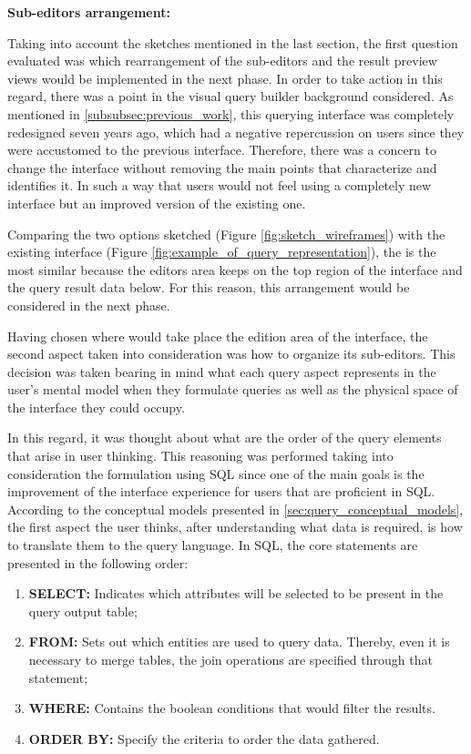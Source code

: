 \textbf{Sub-editors arrangement:}

\medskip

Taking into account the sketches mentioned in the last section, the first question evaluated was which rearrangement of the sub-editors and the result preview views would be implemented in the next phase. In order to take action in this regard, there was a point in the visual query builder background considered. As mentioned in \ref{subsubsec:previous_work}, this querying interface was completely redesigned seven years ago, which had a negative repercussion on users since they were accustomed to the previous interface. Therefore, there was a concern to change the interface without removing the main points that characterize and identifies it. In such a way that users would not feel using a completely new interface but an improved version of the existing one.

Comparing the two options sketched (Figure \ref{fig:sketch_wireframes}) with the existing interface (Figure \ref{fig:example_of_query_representation}), the  is the most similar because the editors area keeps on the top region of the interface and the query result data below. For this reason, this arrangement would be considered in the next phase.

Having chosen where would take place the edition area of the interface, the second aspect taken into consideration was how to organize its sub-editors. This decision was taken bearing in mind what each query aspect represents in the user's mental model when they formulate queries as well as the physical space of the interface they could occupy.

In this regard, it was thought about what are the order of the query elements that arise in user thinking. This reasoning was performed taking into consideration the formulation using \gls{SQL} since one of the main goals is the improvement of the interface experience for users that are proficient in \gls{SQL}. According to the conceptual models presented in \ref{sec:query_conceptual_models}, the first aspect the user thinks, after understanding what data is required, is how to translate them to the query language. In \gls{SQL}, the core statements are presented in the following order:

\begin{enumerate}
  \item \textbf{SELECT: }Indicates which attributes will be selected to be present in the query output table;
  \item \textbf{FROM: }Sets out which entities are used to query data. Thereby, even it is necessary to merge tables, the join operations are specified through that statement;
  \item \textbf{WHERE: }Contains the boolean conditions that would filter the results.
  \item \textbf{ORDER BY: }Specify the criteria to order the data gathered.
\end{enumerate}

